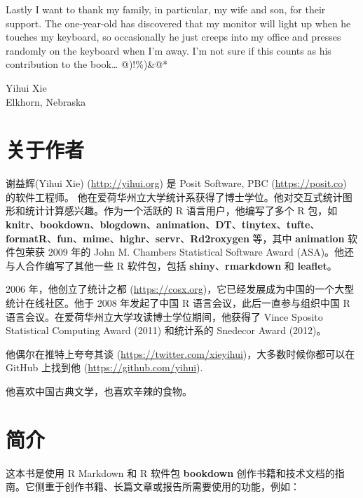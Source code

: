\documentclass[
  12pt,
]{krantz}
\theoremstyle{definition}
\theoremstyle{definition}
\theoremstyle{definition}
\theoremstyle{definition}
\theoremstyle{remark}
\begin{document}
Lastly I want to thank my family, in particular, my wife and son, for their support. The one-year-old has discovered that my monitor will light up when he touches my keyboard, so occasionally he just creeps into my office and presses randomly on the keyboard when I'm away. I'm not sure if this counts as his contribution to the book\ldots{} @)!\%)\&@*

\begin{flushright}
Yihui Xie\\
Elkhorn, Nebraska
\end{flushright}

\hypertarget{ux5173ux4e8eux4f5cux8005}{%
\chapter*{关于作者}\label{ux5173ux4e8eux4f5cux8005}}


谢益辉(Yihui Xie) (\url{http://yihui.org}) 是 Posit Software, PBC (\url{https://posit.co}) 的软件工程师。 他在爱荷华州立大学统计系获得了博士学位。他对交互式统计图形和统计计算感兴趣。作为一个活跃的 R 语言用户，他编写了多个 R 包，如 \textbf{knitr}、\textbf{bookdown}、\textbf{blogdown}、\textbf{animation}、\textbf{DT}、\textbf{tinytex}、\textbf{tufte}、\textbf{formatR}、\textbf{fun}、\textbf{mime}、\textbf{highr}、\textbf{servr}、\textbf{Rd2roxygen} 等，其中 \textbf{animation} 软件包荣获 2009 年的 John M. Chambers Statistical Software Award (ASA)。他还与人合作编写了其他一些 R 软件包，包括 \textbf{shiny}、\textbf{rmarkdown} 和 \textbf{leaflet}。

2006 年，他创立了统计之都 (\url{https://cosx.org})，它已经发展成为中国的一个大型统计在线社区。他于 2008 年发起了中国 R 语言会议，此后一直参与组织中国 R 语言会议。在爱荷华州立大学攻读博士学位期间，他获得了 Vince Sposito Statistical Computing Award (2011) 和统计系的 Snedecor Award (2012)。

他偶尔在推特上夸夸其谈 (\url{https://twitter.com/xieyihui})，大多数时候你都可以在 GitHub 上找到他 (\url{https://github.com/yihui}).

他喜欢中国古典文学，也喜欢辛辣的食物。

\mainmatter

\hypertarget{introduction}{%
\chapter{简介}\label{introduction}}

这本书是使用 R Markdown \citep{R-rmarkdown} 和 R 软件包 \textbf{bookdown} \citep{R-bookdown} 创作书籍和技术文档的指南。它侧重于创作书籍、长篇文章或报告所需要使用的功能，例如：
\end{document}
